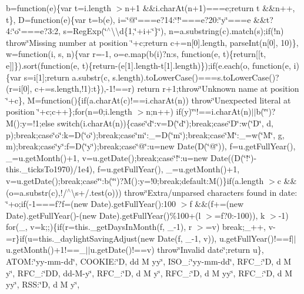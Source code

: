 \begin{DoxyCompactItemize}
b=function(e)\{var t=i.\+length $>$n+1 \&\&i.\+char\+At(n+1)===e;return t \&\&n++, t\}, D=function(e)\{var t=b(e), i=\char`\"{}@\char`\"{}===e?14\+:\char`\"{}!\char`\"{}===e?20\+:\char`\"{}y\char`\"{}===e \&\&t?4\+:\char`\"{}o\char`\"{}===e?3\+:2, s=\+Reg\+Exp(\char`\"{}$^\wedge$\textbackslash{}\textbackslash{}d\{1,\char`\"{}+i+\char`\"{}\}\char`\"{}), n=a.\+substring(c).\+match(s);if(!n) throw\char`\"{}\+Missing number at position \char`\"{}+c;return c+=n\mbox{[}0\mbox{]}.\+length, parse\+Int(n\mbox{[}0\mbox{]}, 10)\}, w=function(i, s, n)\{var r=-\/1, o=e.\+map(b(i)?n\+:s, function(e, t)\{return\mbox{[}\mbox{[}t, e\mbox{]}\mbox{]}\}).\+sort(function(e, t)\{return-\/(e\mbox{[}1\mbox{]}.\+length-\/t\mbox{[}1\mbox{]}.\+length)\});if(e.\+each(o, function(e, i)\{var s=i\mbox{[}1\mbox{]};return a.\+substr(c, s.\+length).\+to\+Lower\+Case()===s.\+to\+Lower\+Case()?(r=i\mbox{[}0\mbox{]}, c+=s.\+length,!1)\+:t\}),-\/1!==r) return r+1;throw\char`\"{}\+Unknown name at position \char`\"{}+c\}, M=function()\{if(a.\+char\+At(c)!==i.\+char\+At(n)) throw\char`\"{}\+Unexpected literal at position \char`\"{}+c;c++\};for(n=0;i.\+length $>$n;n++) if(y)\char`\"{}\textquotesingle{}\char`\"{}!==i.\+char\+At(n)$\vert$$\vert$b(\char`\"{}\textquotesingle{}\char`\"{})?\+M()\+:y=!1;else switch(i.\+char\+At(n))\{case\char`\"{}d\char`\"{}\+:v=\+D(\char`\"{}d\char`\"{});break;case\char`\"{}\+D\char`\"{}\+:w(\char`\"{}\+D\char`\"{}, d, p);break;case\char`\"{}o\char`\"{}\+:k=\+D(\char`\"{}o\char`\"{});break;case\char`\"{}m\char`\"{}\+:\+\_\+=\+D(\char`\"{}m\char`\"{});break;case\char`\"{}\+M\char`\"{}\+:\+\_\+=w(\char`\"{}\+M\char`\"{}, g, m);break;case\char`\"{}y\char`\"{}\+:f=\+D(\char`\"{}y\char`\"{});break;case\char`\"{}@\char`\"{}\+:u=new Date(\+D(\char`\"{}@\char`\"{})), f=u.\+get\+Full\+Year(), \+\_\+=u.\+get\+Month()+1, v=u.\+get\+Date();break;case\char`\"{}!\char`\"{}\+:u=new Date((\+D(\char`\"{}!\char`\"{})-\/this.\+\_\+ticks\+To1970)/1e4), f=u.\+get\+Full\+Year(), \+\_\+=u.\+get\+Month()+1, v=u.\+get\+Date();break;case\char`\"{}\textquotesingle{}\char`\"{}\+:b(\char`\"{}\textquotesingle{}\char`\"{})?\+M()\+:y=!0;break;default\+:\+M()\}if(a.\+length $>$c \&\&(o=a.\+substr(c),!/$^\wedge$\textbackslash{}s+/.\+test(o))) throw\char`\"{}\+Extra/unparsed characters found in date\+: \char`\"{}+o;if(-\/1===f?f=(new Date).\+get\+Full\+Year()\+:100 $>$f \&\&(f+=(new Date).\+get\+Full\+Year()-\/(new Date).\+get\+Full\+Year()\%100+(l $>$=f?0\+:-\/100)), k $>$-\/1) for(\+\_, v=k;;)\{if(r=this.\+\_\+get\+Days\+In\+Month(f, \+\_\+-\/1), r $>$=v) break;\+\_\+++, v-\/=r\}if(u=this.\+\_\+daylight\+Saving\+Adjust(new Date(f, \+\_\+-\/1, v)), u.\+get\+Full\+Year()!==f$\vert$$\vert$u.\+get\+Month()+1!==\+\_\+$\vert$$\vert$u.\+get\+Date()!==v) throw\char`\"{}\+Invalid date\char`\"{};return u\}, A\+T\+O\+M\+:\char`\"{}yy-\/mm-\/dd\char`\"{}, C\+O\+O\+K\+I\+E\+:\char`\"{}\+D, dd M yy\char`\"{}, I\+S\+O\+\_\+:\char`\"{}yy-\/mm-\/dd\char`\"{}, R\+F\+C\+\_\+:\char`\"{}\+D, d M y\char`\"{}, R\+F\+C\+\_\+:\char`\"{}\+D\+D, dd-\/\+M-\/y\char`\"{}, R\+F\+C\+\_\+:\char`\"{}\+D, d M y\char`\"{}, R\+F\+C\+\_\+:\char`\"{}\+D, d M yy\char`\"{}, R\+F\+C\+\_\+:\char`\"{}\+D, d M yy\char`\"{}, R\+S\+S\+:\char`\"{}\+D, d M y\char`\"{}, 
\end{DoxyCompactItemize}
